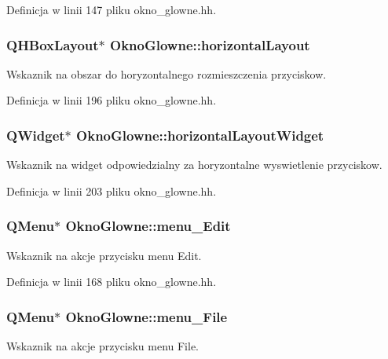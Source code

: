 Definicja w linii 147 pliku okno\-\_\-glowne.\-hh.

\hypertarget{class_okno_glowne_aacb5ddb6d0eb560a47917cc1b457239a}{
\subsubsection[{horizontal\-Layout}]{\setlength{\rightskip}{0pt plus 5cm}Q\-H\-Box\-Layout$\ast$ Okno\-Glowne\-::horizontal\-Layout}}\label{class_okno_glowne_aacb5ddb6d0eb560a47917cc1b457239a}
Wskaznik na obszar do horyzontalnego rozmieszczenia przyciskow. 

Definicja w linii 196 pliku okno\-\_\-glowne.\-hh.

\hypertarget{class_okno_glowne_a12ac2d00b9ca186176ccc710a928a723}{
\subsubsection[{horizontal\-Layout\-Widget}]{\setlength{\rightskip}{0pt plus 5cm}Q\-Widget$\ast$ Okno\-Glowne\-::horizontal\-Layout\-Widget}}\label{class_okno_glowne_a12ac2d00b9ca186176ccc710a928a723}
Wskaznik na widget odpowiedzialny za horyzontalne wyswietlenie przyciskow. 

Definicja w linii 203 pliku okno\-\_\-glowne.\-hh.

\hypertarget{class_okno_glowne_a93afadd0ec22ce6a7e29acc5dd2423a2}{
\subsubsection[{menu\-\_\-\-Edit}]{\setlength{\rightskip}{0pt plus 5cm}Q\-Menu$\ast$ Okno\-Glowne\-::menu\-\_\-\-Edit}}\label{class_okno_glowne_a93afadd0ec22ce6a7e29acc5dd2423a2}
Wskaznik na akcje przycisku menu Edit. 

Definicja w linii 168 pliku okno\-\_\-glowne.\-hh.

\hypertarget{class_okno_glowne_a1ba162db2d0b06b0f8963e61b3806875}{
\subsubsection[{menu\-\_\-\-File}]{\setlength{\rightskip}{0pt plus 5cm}Q\-Menu$\ast$ Okno\-Glowne\-::menu\-\_\-\-File}}\label{class_okno_glowne_a1ba162db2d0b06b0f8963e61b3806875}
Wskaznik na akcje przycisku menu File. 


